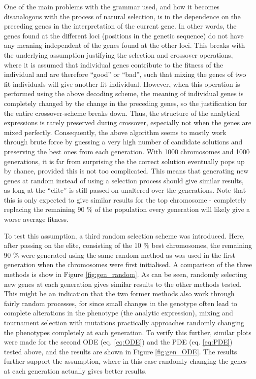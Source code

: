 \documentclass[multicolumn, 9pt]{extarticle}
\begin{document}
One of the main problems with the grammar used, and how it becomes disanalogous with the process of natural selection, is in the dependence on the preceding genes in the interpretation of the current gene. In other words, the genes found at the different loci (positions in the genetic sequence) do not have any meaning independent of the genes found at the other loci. This breaks with the underlying assumption justifying the selection and crossover operations, where it is assumed that individual genes contribute to the fitness of the individual and are therefore ``good'' or ``bad'', such that mixing the genes of two fit individuals will give another fit individual. However, when this operation is performed using the above decoding scheme, the meaning of individual genes is completely changed by the change in the preceding genes, so the justification for the entire crossover-scheme breaks down. Thus, the structure of the analytical expressions is rarely preserved during crossover, especially not when the genes are mixed perfectly. Consequently, the above algorithm seems to mostly work through brute force by guessing a very high number of candidate solutions and preserving the best ones from each generation. With 1000 chromosomes and 1000 generations, it is far from surprising the the correct solution eventually pops up by chance, provided this is not too complicated. This means that generating new genes at random instead of using a selection process should give similar results, as long at the ``elite'' is still passed on unaltered over the generations. Note that this is only expected to give similar results for the top chromosome - completely replacing the remaining 90 \% of the population every generation will likely give a worse average fitness.

To test this assumption, a third random selection scheme was introduced. Here, after passing on the elite, consisting of the 10 \% best chromosomes, the remaining 90 \% were generated using the same random method as was used in the first generation when the chromosomes were first initialised. A comparison of the three methods is show in Figure \ref{fig:gen_random}. As can be seen, randomly selecting new genes at each generation gives similar results to the other methods tested. This might be an indication that the two former methods also work through fairly random processes, for since small changes in the genotype often lead to complete alterations in the phenotype (the analytic expression), mixing and tournament selection with mutations practically approaches randomly changing the phenotypes completely at each generation. To verify this further, similar plots were made for the second ODE (eq. \eqref{eq:ODE}) and the PDE (eq. \eqref{eq:PDE}) tested above, and the results are shown in Figure \ref{fig:gen_ODE}. The results further support the assumption, where in this case randomly changing the genes at each generation actually gives better results.
\end{document}
